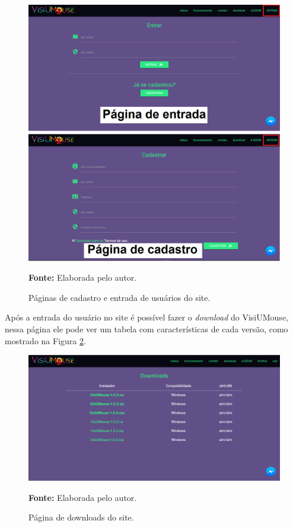 \begin{figure}[htbp]
\caption{Páginas de cadastro e entrada de usuários do site.} 
\centering \includegraphics[scale=0.45]{img/site-entrar.png}

{\fontsize{11}{11}\selectfont \textbf{Fonte:} Elaborada pelo autor.}
\label{fig:site-entrar}
\end{figure}

Após a entrada do usuário no site é possível fazer o \textit{download} do VisiUMouse, nessa página ele pode ver um tabela com características de cada versão, como mostrado na Figura \ref{fig:site-download}.

\begin{figure}[htbp]
\caption{Página de downloads do site.} 
\centering \includegraphics[scale=0.45]{img/site-download.png}

{\fontsize{11}{11}\selectfont \textbf{Fonte:} Elaborada pelo autor.}
\label{fig:site-download}
\end{figure}

